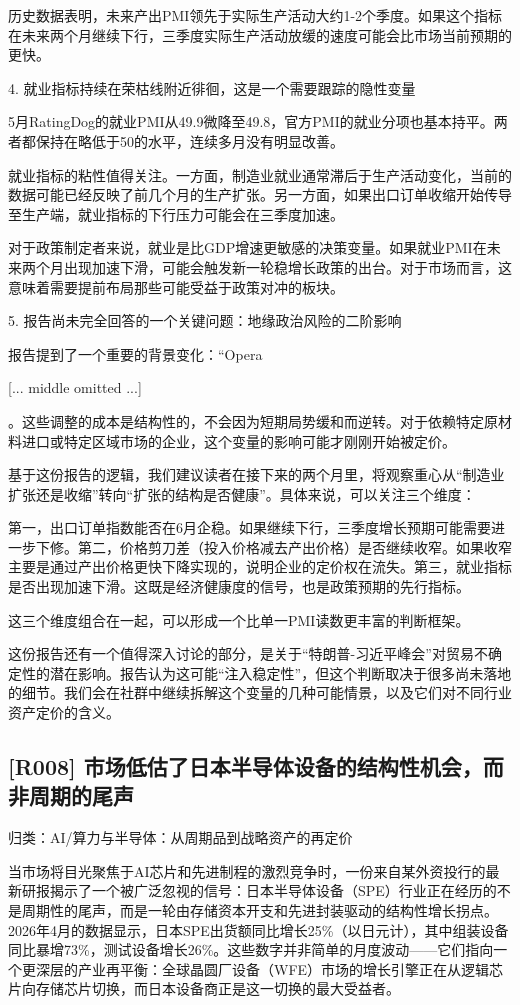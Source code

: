 \documentclass[11pt]{ctexart}
\begin{document}
历史数据表明，未来产出PMI领先于实际生产活动大约1-2个季度。如果这个指标在未来两个月继续下行，三季度实际生产活动放缓的速度可能会比市场当前预期的更快。

4. 就业指标持续在荣枯线附近徘徊，这是一个需要跟踪的隐性变量

5月RatingDog的就业PMI从49.9微降至49.8，官方PMI的就业分项也基本持平。两者都保持在略低于50的水平，连续多月没有明显改善。

就业指标的粘性值得关注。一方面，制造业就业通常滞后于生产活动变化，当前的数据可能已经反映了前几个月的生产扩张。另一方面，如果出口订单收缩开始传导至生产端，就业指标的下行压力可能会在三季度加速。

对于政策制定者来说，就业是比GDP增速更敏感的决策变量。如果就业PMI在未来两个月出现加速下滑，可能会触发新一轮稳增长政策的出台。对于市场而言，这意味着需要提前布局那些可能受益于政策对冲的板块。

5. 报告尚未完全回答的一个关键问题：地缘政治风险的二阶影响

报告提到了一个重要的背景变化：“Opera

[... middle omitted ...]

。这些调整的成本是结构性的，不会因为短期局势缓和而逆转。对于依赖特定原材料进口或特定区域市场的企业，这个变量的影响可能才刚刚开始被定价。

基于这份报告的逻辑，我们建议读者在接下来的两个月里，将观察重心从“制造业扩张还是收缩”转向“扩张的结构是否健康”。具体来说，可以关注三个维度：

第一，出口订单指数能否在6月企稳。如果继续下行，三季度增长预期可能需要进一步下修。第二，价格剪刀差（投入价格减去产出价格）是否继续收窄。如果收窄主要是通过产出价格更快下降实现的，说明企业的定价权在流失。第三，就业指标是否出现加速下滑。这既是经济健康度的信号，也是政策预期的先行指标。

这三个维度组合在一起，可以形成一个比单一PMI读数更丰富的判断框架。

这份报告还有一个值得深入讨论的部分，是关于“特朗普-习近平峰会”对贸易不确定性的潜在影响。报告认为这可能“注入稳定性”，但这个判断取决于很多尚未落地的细节。我们会在社群中继续拆解这个变量的几种可能情景，以及它们对不同行业资产定价的含义。

\subsection{[R008] 市场低估了日本半导体设备的结构性机会，而非周期的尾声}
{\small\color{refgray}归类：AI/算力与半导体：从周期品到战略资产的再定价}

当市场将目光聚焦于AI芯片和先进制程的激烈竞争时，一份来自某外资投行的最新研报揭示了一个被广泛忽视的信号：日本半导体设备（SPE）行业正在经历的不是周期性的尾声，而是一轮由存储资本开支和先进封装驱动的结构性增长拐点。2026年4月的数据显示，日本SPE出货额同比增长25\%（以日元计），其中组装设备同比暴增73\%，测试设备增长26\%。这些数字并非简单的月度波动——它们指向一个更深层的产业再平衡：全球晶圆厂设备（WFE）市场的增长引擎正在从逻辑芯片向存储芯片切换，而日本设备商正是这一切换的最大受益者。
\end{document}
